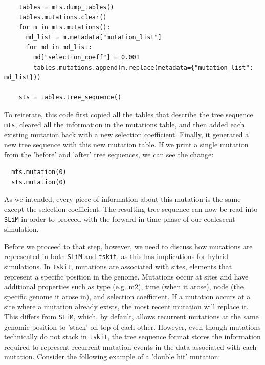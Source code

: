 \documentclass[12pt]{article}
\newcommand{\tskit}[0]{\texttt{tskit}\xspace}
\newcommand{\slim}[0]{\texttt{SLiM}\xspace}
\begin{document}
\begin{listing}[H]
  \begin{verbatim}
    tables = mts.dump_tables()
    tables.mutations.clear()
    for m in mts.mutations():
      md_list = m.metadata["mutation_list"]
      for md in md_list:
        md["selection_coeff"] = 0.001
        tables.mutations.append(m.replace(metadata={"mutation_list": md_list}))

    sts = tables.tree_sequence()
  \end{verbatim}
\end{listing}

To reiterate, this code first copied all the tables that describe the tree sequence \verb|mts|, cleared all the
information in the mutations table, and then added each existing mutation back with a new selection
coefficient. Finally, it generated a new tree sequence with this new mutation table. If we print a single
mutation from the 'before' and 'after' tree sequences, we can see the change:

\begin{listing}[H]
  \begin{verbatim}
  mts.mutation(0)
  sts.mutation(0)
  \end{verbatim}
\end{listing}

As we intended, every piece of information about this mutation is the same except the selection coefficient. The resulting tree
sequence can now be read into \slim in order to proceed with the forward-in-time phase of our coalescent simulation.

Before we proceed to that step, however, we need to discuss how mutations are represented in both \slim and \tskit, as this has
implications for hybrid simulations. In \tskit, mutations are associated with sites, elements that represent a specific
position in the genome. Mutations occur at sites and have additional properties such as type (e.g. m2), time (when it arose),
node (the specific genome it arose in), and selection coefficient. If a mutation occurs at a site where a mutation already exists,
the most recent mutation will replace it. This differs from \slim, which, by default, allows recurrent mutations at the same genomic
position to 'stack' on top of each other. However, even though mutations technically do not stack in \tskit, the tree sequence
format stores the information required to represent recurrent mutation events in the data associated with each mutation.
Consider the following example of a 'double hit' mutation:
\end{document}
